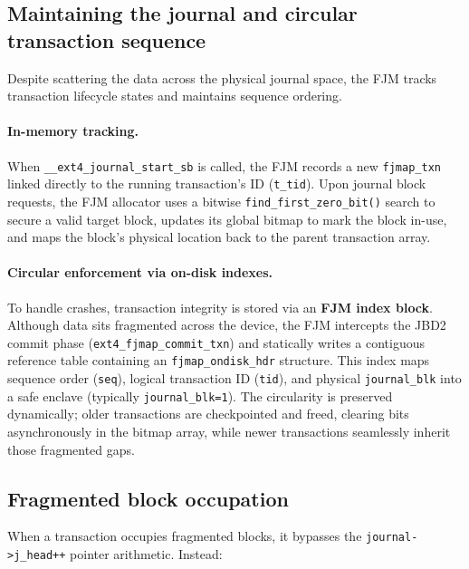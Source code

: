 \documentclass[12pt,a4paper]{article}
\begin{document}
\subsection{Maintaining the journal and circular transaction sequence}

Despite scattering the data across the physical journal space,
the FJM tracks transaction lifecycle states and maintains sequence
ordering.

\paragraph{In-memory tracking.} When
\texttt{\_\_ext4\_journal\_start\_sb} is called, the FJM records a
new \texttt{fjmap\_txn} linked directly to the running
transaction's ID (\texttt{t\_tid}). Upon journal block requests,
the FJM allocator uses a bitwise \texttt{find\_first\_zero\_bit()}
search to secure a valid target block, updates its global bitmap
to mark the block in-use, and maps the block's physical location
back to the parent transaction array.

\paragraph{Circular enforcement via on-disk indexes.} To handle
crashes, transaction integrity is stored via an
\textbf{FJM index block}. Although data sits fragmented across
the device, the FJM intercepts the JBD2 commit phase
(\texttt{ext4\_fjmap\_commit\_txn}) and statically writes a
contiguous reference table containing an
\texttt{fjmap\_ondisk\_hdr} structure. This index maps sequence
order (\texttt{seq}), logical transaction ID (\texttt{tid}), and
physical \texttt{journal\_blk} into a safe enclave (typically
\texttt{journal\_blk=1}). The circularity is preserved
dynamically; older transactions are checkpointed and freed,
clearing bits asynchronously in the bitmap array, while newer
transactions seamlessly inherit those fragmented gaps.

\subsection{Fragmented block occupation}

When a transaction occupies fragmented blocks, it bypasses the
\texttt{journal->j\_head++} pointer arithmetic. Instead:
\end{document}
